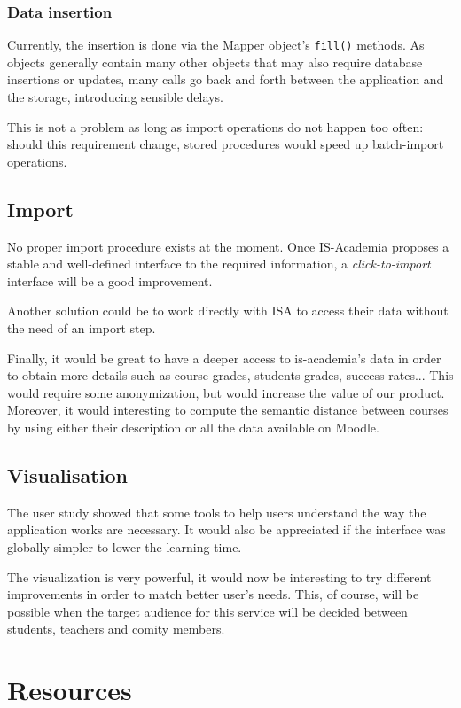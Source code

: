 \subsection{Data insertion}
Currently, the insertion is done via the Mapper object's \verb|fill()| methods. As objects generally contain many other objects that may also require database insertions or updates, many calls go back and forth between the application and the storage, introducing sensible delays.

This is not a problem as long as import operations do not happen too often: should this requirement change, stored procedures would speed up batch-import operations.

\section{Import}
No proper import procedure exists at the moment. Once IS-Academia proposes a stable and well-defined interface to the required information, a \emph{click-to-import} interface will be a good improvement. 

Another solution could be to work directly with ISA to access their data without the need of an import step.

Finally, it would be great to have a deeper access to is-academia's data in order to obtain more details such as course grades, students grades, success rates... This would require some anonymization, but would increase the value of our product. Moreover, it would interesting to compute the semantic distance between courses by using either their description or all the data available on Moodle. 

\section{Visualisation}
The user study showed that some tools to help users understand the way the application works are necessary. It would also be appreciated if the interface was globally simpler to lower the learning time. 

The visualization is very powerful, it would now be interesting to try different improvements in order to match better user's needs. This, of course, will be possible when the target audience for this service will be decided between students, teachers and comity members. 


\chapter{Resources}

